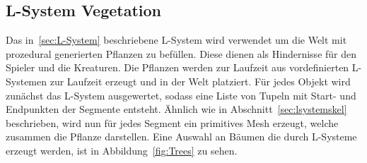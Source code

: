 \subsection{L-System Vegetation}
Das in~\ref{sec:L-System} beschriebene L-System wird verwendet um die Welt mit prozedural generierten Pflanzen zu befüllen.
Diese dienen als Hindernisse für den Spieler und die Kreaturen.
Die Pflanzen werden zur Laufzeit aus vordefinierten L-Systemen zur Laufzeit erzeugt und in der Welt platziert.
Für jedes Objekt wird zunächst das L-System ausgewertet, sodass eine Liste von Tupeln mit Start- und Endpunkten der Segmente entsteht.
Ähnlich wie in Abschnitt~\ref{sec:lsystemskel} beschrieben, wird nun für jedes Segment ein primitives Mesh erzeugt, welche zusammen die Pflanze darstellen.
Eine Auswahl an Bäumen die durch L-Systeme erzeugt werden, ist in Abbildung~\ref{fig:Trees} zu sehen.
